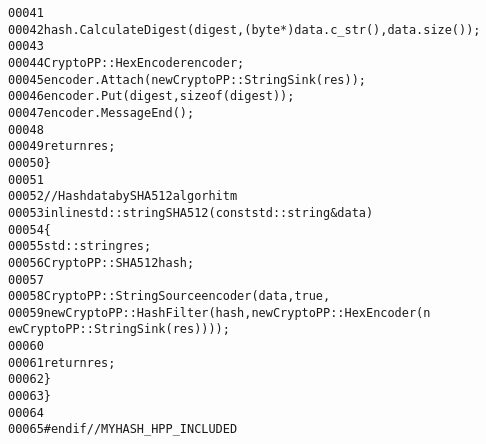 \begin{footnotesize}
\begin{alltt}
00041 
00042                 hash.CalculateDigest(digest, (byte*)data.c\_str(), data.size());
00043 
00044                 CryptoPP::HexEncoder encoder;
00045                 encoder.Attach(\textcolor{keyword}{new} CryptoPP::StringSink(res));
00046                 encoder.Put(digest, \textcolor{keyword}{sizeof}(digest));
00047                 encoder.MessageEnd();
00048 
00049                 \textcolor{keywordflow}{return} res;
00050         \}
00051 
00052         \textcolor{comment}{//Hash data by SHA512 algorhitm}
00053         \textcolor{keyword}{inline} std::string SHA512(\textcolor{keyword}{const} std::string &data)
00054         \{
00055                 std::string res;
00056                 CryptoPP::SHA512 hash;
00057 
00058                 CryptoPP::StringSource encoder(data, \textcolor{keyword}{true},
00059                         \textcolor{keyword}{new} CryptoPP::HashFilter(hash, \textcolor{keyword}{new} CryptoPP::HexEncoder(\textcolor{keyword}{n
      ew} CryptoPP::StringSink(res))));
00060 
00061                 \textcolor{keywordflow}{return} res;
00062         \}
00063 \}
00064 
00065 \textcolor{preprocessor}{#endif // MYHASH\_HPP\_INCLUDED}
\end{alltt}\end{footnotesize}
